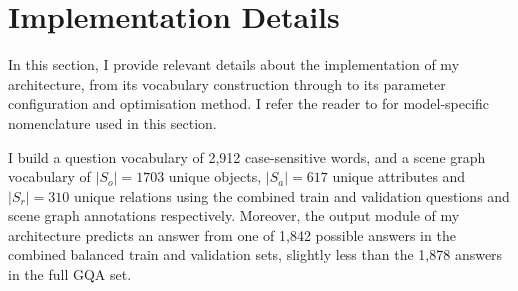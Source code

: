 






\section{Implementation Details}
\label{sec:implementation_details}
In this section, I provide relevant details about the implementation of my architecture, from its vocabulary construction through to its parameter configuration and optimisation method. I refer the reader to \chapterautorefname{ \ref{chapter:methodology}} for model-specific nomenclature used in this section.

I build a question vocabulary of 2,912 case-sensitive words, and a scene graph vocabulary of \(|S_o| = 1703\) unique objects, \(|S_a| = 617\) unique attributes and \(|S_r| = 310\) unique relations using the combined train and validation questions and scene graph annotations respectively. Moreover, the output module of my architecture predicts an answer from one of 1,842 possible answers in the combined balanced train and validation sets, slightly less than the 1,878 answers in the full GQA set.

